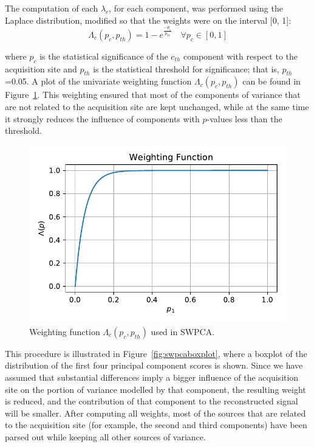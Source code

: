 The computation of each ${\lambda }_{c}$, for each component, was performed using the Laplace distribution, modified so that the weights were on the interval [0, 1]:
\begin{equation}
	\Lambda_{c}(p_c, p_{th}) = 1-e^{\frac{-p_c}{p_{th}}} \quad \forall p_c \in \left[0,1\right]
\end{equation}

where  ${p}_{c}$ is the statistical significance of the $c_{th}$ component with respect to the acquisition site and ${p}_{th}$ is the statistical threshold for significance; that is,  ${p}_{th}$=0.05. A plot of the univariate weighting function $\Lambda_c(p_c,p_{th})$ can be found in Figure~\ref{fig:swpcasweigthing}. This weighting ensured that most of the components of variance that are not related to the acquisition site are kept unchanged, while at the same time it strongly reduces the influence of components with $p$-values less than the threshold. 

\begin{figure}
	\centering
	\includegraphics[width=0.7\linewidth]{Graphics/ch7/weighting2}
	\caption[Weighting function $\Lambda_c(p_c,p_{th})$ used in \acs{SWPCA}.]{Weighting function $\Lambda_c(p_c,p_{th})$ used in \ac{SWPCA}.}
	\label{fig:swpcasweigthing}
\end{figure}

This procedure is illustrated in Figure~\ref{fig:swpcaboxplot}, where a boxplot of the distribution of the first four principal component scores is shown. Since we have assumed that substantial differences imply a bigger influence of the acquisition site on the portion of variance modelled by that component, the resulting weight is reduced, and the contribution of that component to the reconstructed signal will be smaller. After computing all weights, most of the sources that are related to the acquisition site (for example, the second and third components) have been parsed out while keeping all other sources of variance.

